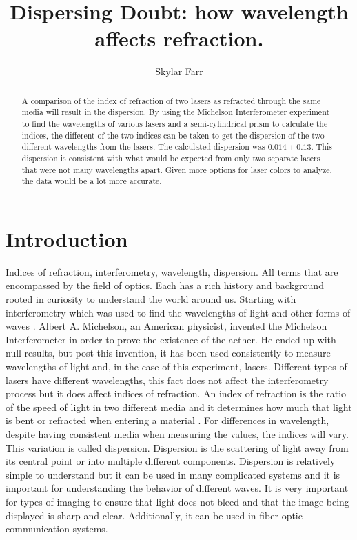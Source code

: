 \documentclass[rc,ec]{physicsinprogress}
\begin{document}
\title{Dispersing Doubt: how wavelength affects refraction.}

\author{Skylar Farr}
%
\begin{abstract}
    A comparison of the index of refraction of two lasers as refracted through the same media will result in the dispersion. By using the Michelson Interferometer experiment to find the wavelengths of various lasers and a semi-cylindrical prism to calculate the indices, the different of the two indices can be taken to get the dispersion of the two different wavelengths from the lasers. The calculated dispersion was $0.014\pm0.13$. This dispersion is consistent with what would be expected from only two separate lasers that were not many wavelengths apart. Given more options for laser colors to analyze, the data would be a lot more accurate.
\end{abstract}


\maketitle
\section{Introduction}
    Indices of refraction, interferometry, wavelength, dispersion. All terms that are encompassed by the field of optics. Each has a rich history and background rooted in curiosity to understand the world around us. Starting with interferometry which was used to find the wavelengths of light and other forms of waves \cite{hariharan2010basics}. Albert A. Michelson, an American physicist, invented the Michelson Interferometer in order to prove the existence of the aether. He ended up with null results, but post this invention, it has been used consistently to measure wavelengths of light and, in the case of this experiment, lasers. Different types of lasers have different wavelengths, this fact does not affect the interferometry process but it does affect indices of refraction. An index of refraction is the ratio of the speed of light in two different media and it determines how much that light is bent or refracted when entering a material \cite{stachura2024fermat}. For differences in wavelength, despite having consistent media when measuring the values, the indices will vary. This variation is called dispersion. Dispersion is the scattering of light away from its central point or into multiple different components. Dispersion is relatively simple to understand but it can be used in many complicated systems and it is important for understanding the behavior of different waves. It is very important for types of imaging to ensure that light does not bleed and that the image being displayed is sharp and clear. Additionally, it can be used in fiber-optic communication systems.
\end{document}
